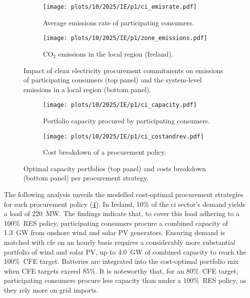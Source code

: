 \documentclass[11pt, 5p, nopreprintline]{elsarticle}
\begin{document}
\begin{figure}[t]
    \centering
    \begin{subfigure}[t]{0.95\columnwidth}
        \centering
        \caption{Average emissions rate of participating consumers.}
        \texttt{[image: plots/10/2025/IE/p1/ci\_emisrate.pdf]}
        \label{fig:10-2025-IE-p1-ci_emisrate}
    \end{subfigure}
    \begin{subfigure}[t]{0.95\columnwidth}
        \centering
        \vspace{-0.2cm}
        \caption{CO$_2$ emissions in the local region (Ireland).}
        \texttt{[image: plots/10/2025/IE/p1/zone\_emissions.pdf]}
        \label{fig:10-2025-IE-p1-zone_emissions}
    \end{subfigure}
    \caption{Impact of clean electricity procurement commitments on emissions of participating consumers (top panel) and the system-level emissions in a local region (bottom panel).}
    \label{fig:10-2025-IE-p1-emissions}
\end{figure}

\begin{figure}[t]
    \centering
    \begin{subfigure}[t]{0.95\columnwidth}
        \centering
        \caption{Portfolio capacity procured by participating consumers.}
        \texttt{[image: plots/10/2025/IE/p1/ci\_capacity.pdf]}
        \label{fig:10-2025-IE-p1-ci_capacity}
    \end{subfigure}
    \begin{subfigure}[t]{0.95\columnwidth}
        \centering
        \vspace{-0.2cm}
        \caption{Cost breakdown of a procurement policy.}
        \texttt{[image: plots/10/2025/IE/p1/ci\_costandrev.pdf]}
        \label{fig:10-2025-IE-p1-ci_costandrev}
    \end{subfigure}
    \caption{Optimal capacity portfolios (top panel) and costs breakdown (bottom panel) per procurement strategy.}
    \label{fig:10-2025-IE-p1-ci_procurement}
\end{figure}

The following analysis unveils the modelled cost-optimal procurement strategies for each procurement policy (\cref{fig:10-2025-IE-p1-ci_capacity}).
In Ireland, 10\% of the \gls{ci} sector's demand yields a load of 220~MW.
The findings indicate that, to cover this load adhering to a 100\%~RES policy, participating consumers procure a combined capacity of 1.3~GW from onshore wind and solar PV generators.
Ensuring demand is matched with \gls{cfe} on an hourly basis requires a considerably more substantial portfolio of wind and solar PV, up to 4.0~GW of combined capacity to reach the 100\%~CFE target.
Batteries are integrated into the cost-optimal portfolio mix when CFE targets exceed 85\%.
It is noteworthy that, for an 80\%~CFE target, participating consumers procure less capacity than under a 100\%~RES policy, as they rely more on grid imports.
\end{document}
